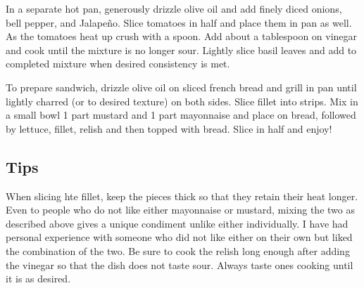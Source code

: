 \tab In a separate hot pan, generously drizzle olive oil and add finely diced onions, bell pepper, and Jalape\~{n}o. Slice tomatoes in half and place them in pan as well. As the tomatoes heat up crush with a spoon. Add about a tablespoon on vinegar and cook until the mixture is no longer sour. Lightly slice basil leaves and add to completed mixture when desired consistency is met. 

\tab To prepare sandwich, drizzle olive oil on sliced french bread and grill in pan until lightly charred (or to desired texture) on both sides. Slice fillet into strips. Mix in a small bowl 1 part mustard and 1 part mayonnaise and place on bread, followed by lettuce, fillet, relish and then topped with bread. Slice in half and enjoy!

\subsection*{Tips}
When slicing hte fillet, keep the pieces thick so that they retain their heat longer. Even to people who do not like either mayonnaise or mustard, mixing the two as described above gives a unique condiment unlike either individually. I have had personal experience with someone who did not like either on their own but liked the combination of the two. Be sure to cook the relish long enough after adding the vinegar so that the dish does not taste sour. Always taste ones cooking until it is as desired.